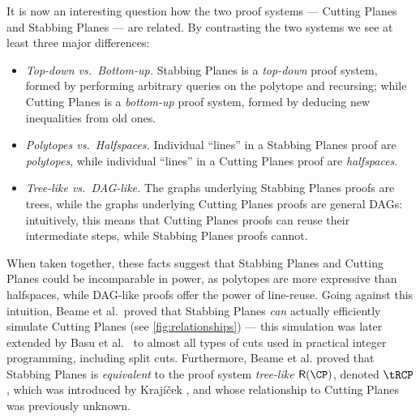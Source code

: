 \documentclass{toc}
\begin{document}
It is now an interesting question how the two proof systems --- Cutting Planes and Stabbing Planes --- are related.
By contrasting the two systems we see at least three major differences:
\begin{itemize}
\item \emph{Top-down vs.~Bottom-up.} Stabbing Planes is a \emph{top-down} proof system, formed by performing arbitrary queries on the polytope and recursing; while Cutting Planes is a \emph{bottom-up} proof system, formed by deducing new inequalities from old ones.  
%
%
%
%
%
%
%
	\item \emph{Polytopes vs.~Halfspaces.} Individual ``lines'' in a Stabbing Planes proof are \emph{polytopes}, while individual ``lines'' in a Cutting Planes proof are \emph{halfspaces}.  
	\item \emph{Tree-like vs.~DAG-like.} The graphs underlying Stabbing Planes proofs are trees, while the graphs underlying Cutting Planes proofs are general DAGs: intuitively, this means that Cutting Planes proofs can %
reuse  %
their intermediate steps, while Stabbing Planes proofs cannot.
\end{itemize}
When taken together, these facts suggest that Stabbing Planes and Cutting Planes could be incomparable in power, as polytopes are more expressive than halfspaces, while DAG-like proofs offer the power of line-reuse.
Going against this intuition, Beame et al.~proved that Stabbing Planes \emph{can} actually efficiently simulate Cutting Planes \cite{BeameFIKPPR18} (see \autoref{fig:relationships}) --- this simulation was later extended by Basu et al.~\cite{BasuCDJ21} to almost all types of cuts used in practical integer programming, including split cuts.
Furthermore, Beame et al. proved that Stabbing Planes is \emph{equivalent} to the proof system \emph{tree-like $\mathsf{R}(\CP)$}, denoted $\tRCP$, which was introduced by Kraj\'{i}\v{c}ek \cite{Krajicek98}, and whose relationship to Cutting Planes was previously unknown.
\end{document}
